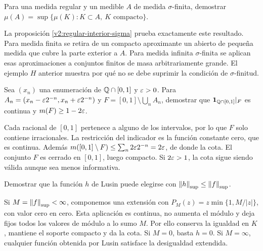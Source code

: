 \begin{ejercicio}\label{ej:v2-l32-1}
Para una medida regular y un medible $A$ de medida $\sigma$-finita, demostrar $\mu(A)=\sup\{\mu(K):K\subset A,\ K\text{ compacto}\}$.
\end{ejercicio}
\begin{solucion}
La proposición \ref{v2:regular-interior-sigma} prueba exactamente este resultado. Para medida finita se retira de un compacto aproximante un abierto de pequeña medida que cubre la parte exterior a $A$. Para medida infinita $\sigma$-finita se aplican esas aproximaciones a conjuntos finitos de masa arbitrariamente grande. El ejemplo $H$ anterior muestra por qué no se debe suprimir la condición de $\sigma$-finitud.
\end{solucion}

\begin{ejercicio}\label{ej:v2-l32-2}
Sea $(x_n)$ una enumeración de $\mathbb Q\cap[0,1]$ y $\varepsilon>0$. Para $A_n=(x_n-\varepsilon2^{-n},x_n+\varepsilon2^{-n})$ y $F=[0,1]\setminus\bigcup_nA_n$, demostrar que $\mathbf1_{\mathbb Q\cap[0,1]}|_F$ es continua y $m(F)\ge1-2\varepsilon$.
\end{ejercicio}
\begin{solucion}
Cada racional de $[0,1]$ pertenece a alguno de los intervalos, por lo que $F$ solo contiene irracionales. La restricción del indicador es la función constante cero, que es continua. Además $m([0,1]\setminus F)\le\sum_n2\varepsilon2^{-n}=2\varepsilon$, de donde la cota. El conjunto $F$ es cerrado en $[0,1]$, luego compacto. Si $2\varepsilon>1$, la cota sigue siendo válida aunque sea menos informativa.
\end{solucion}

\begin{ejercicio}\label{ej:v2-l32-3}
Demostrar que la función $h$ de Lusin puede elegirse con $\left\lVert h\right\rVert_{\mathrm{sup}}\le\left\lVert f\right\rVert_{\mathrm{sup}}$.
\end{ejercicio}
\begin{solucion}
Si $M=\left\lVert f\right\rVert_{\mathrm{sup}}<\infty$, componemos una extensión con $P_M(z)=z\min\{1,M/|z|\}$, con valor cero en cero. Esta aplicación es continua, no aumenta el módulo y deja fijos todos los valores de módulo a lo sumo $M$. Por ello conserva la igualdad en $K$, mantiene el soporte compacto y da la cota. Si $M=0$, basta $h=0$. Si $M=\infty$, cualquier función obtenida por Lusin satisface la desigualdad extendida.
\end{solucion}

